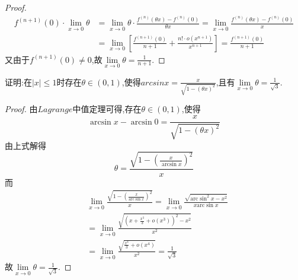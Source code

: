 \documentclass[lang=cn,newtx,10pt,scheme=chinese]{elegantbook}
\begin{document}
\begin{proof}
        \begin{equation}
        \begin{split}
            f^{\left( n+1 \right)}\left( 0 \right) \cdot \underset{x\rightarrow 0}{\lim}\theta &=\underset{x\rightarrow 0}{\lim}\theta \cdot \frac{f^{\left( n \right)}\left( \theta x \right) -f^{\left( n \right)}\left( 0 \right)}{\theta x}=\underset{x\rightarrow 0}{\lim}\frac{f^{\left( n \right)}\left( \theta x \right) -f^{\left( n \right)}\left( 0 \right)}{x}
            \\
            &=\underset{x\rightarrow 0}{\lim}\left[ \frac{f^{\left( n+1 \right)}\left( 0 \right)}{n+1}+\frac{n!\cdot o\left( x^{n+1} \right)}{x^{n+1}} \right] =\frac{f^{\left( n+1 \right)}\left( 0 \right)}{n+1}
        \end{split}
        \nonumber  
    \end{equation}
        又由于\(f^{(n + 1)}(0)\neq0\),故$\underset{x\rightarrow 0}{\lim}\theta =\frac{1}{n+1}$.
    \end{proof}


\begin{exercise}
    证明:在\(\vert x\vert\leq1\)时存在\(\theta\in(0,1)\),使得\(arcsinx=\frac{x}{\sqrt{1-\left( \theta x \right) ^2}}\),且有\(\lim\limits_{x\to0}\theta=\frac{1}{\sqrt{3}}\).
\end{exercise}
    \begin{proof}
        由$Lagrange$中值定理可得,存在$\theta\in(0,1)$,使得
        \begin{equation}
            \arcsin x-\arcsin 0=\frac{x}{\sqrt{1-\left( \theta x \right) ^2}}
        \nonumber
        \end{equation}
        由上式解得
        \begin{equation}
            \theta =\frac{\sqrt{1-\left( \frac{x}{\arcsin x} \right) ^2}}{x}
            \nonumber
        \end{equation}
        而
        \begin{equation}
            \begin{split}
                &\lim_{x\rightarrow 0} \frac{\sqrt{1-\left( \frac{x}{\mathrm{arc}\sin x} \right) ^2}}{x}=\lim_{x\rightarrow 0} \frac{\sqrt{\mathrm{arc}\sin ^2x-x^2}}{x\mathrm{arc}\sin x}
                \\
                &=\lim_{x\rightarrow 0} \frac{\sqrt{\left( x+\frac{x^3}{3}+o\left( x^3 \right) \right) ^2-x^2}}{x^2}
                \\
                &=\lim_{x\rightarrow 0} \frac{\sqrt{\frac{x^4}{3}+o\left( x^4 \right)}}{x^2}=\frac{1}{\sqrt{3}}
            \end{split}
            \nonumber
        \end{equation}
        故\(\lim\limits_{x\to0}\theta=\frac{1}{\sqrt{3}}\).
    \end{proof}
\end{document}
